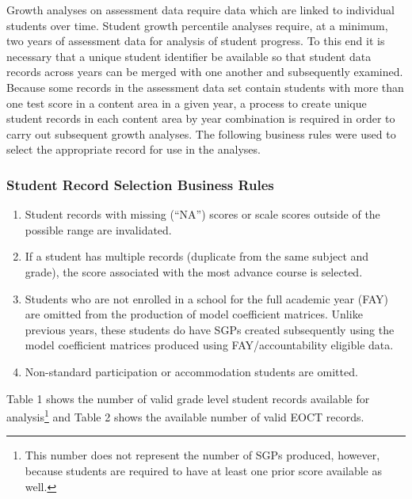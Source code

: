 \documentclass[12pt]{article}
\begin{document}
Growth analyses on assessment data require data which are linked to
individual students over time. Student growth percentile analyses
require, at a minimum, two years of assessment data for analysis of
student progress. To this end it is necessary that a unique student
identifier be available so that student data records across years can be
merged with one another and subsequently examined. Because some records
in the assessment data set contain students with more than one test
score in a content area in a given year, a process to create unique
student records in each content area by year combination is required in
order to carry out subsequent growth analyses. The following business
rules were used to select the appropriate record for use in the
analyses.

\subsubsection{Student Record Selection Business
Rules}\label{student-record-selection-business-rules}

\begin{enumerate}
\def\labelenumi{\arabic{enumi}.}
\itemsep1pt\parskip0pt
\item
  Student records with missing (``NA'') scores or scale scores outside
  of the possible range are invalidated.
\item
  If a student has multiple records (duplicate from the same subject and
  grade), the score associated with the most advance course is selected.
\item
  Students who are not enrolled in a school for the full academic year
  (FAY) are omitted from the production of model coefficient matrices.
  Unlike previous years, these students do have SGPs created
  subsequently using the model coefficient matrices produced using
  FAY/accountability eligible data.
\item
  Non-standard participation or accommodation students are omitted.
\end{enumerate}

Table 1 shows the number of valid grade level student records available
for analysis\footnote{This number does not represent the number of SGPs
  produced, however, because students are required to have at least one
  prior score available as well.} and Table 2 shows the available number
of valid EOCT records.
\end{document}
